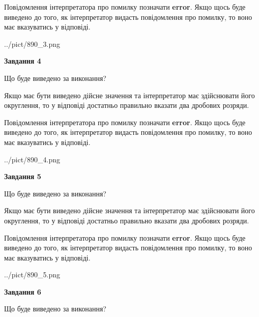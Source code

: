 \documentclass[12pt, ukrainian]{article}
\begin{document}
{\begin {Large}
Повідомлення інтерпретатора про помилку позначати \textbf{error}.
Якщо щось буде виведено до того, як інтерпретатор видасть повідомлення про помилку, 
то воно має вказуватись у відповіді. \par

\begin{center}
	{../pict/890_3.png}
\end{center}
\newpage

{\begin {center}\textbf{Завдання 4}\end {center}}\par
Що буде виведено за виконання? \par

Якщо має бути виведено дійсне значення та інтерпретатор має здійснювати його округлення, 
то у відповіді достатньо правильно вказати два дробових розряди.

Повідомлення інтерпретатора про помилку позначати \textbf{error}.
Якщо щось буде виведено до того, як інтерпретатор видасть повідомлення про помилку, 
то воно має вказуватись у відповіді. \par

\begin{center}
	{../pict/890_4.png}
\end{center}
\newpage

{\begin {center}\textbf{Завдання 5}\end {center}}\par
Що буде виведено за виконання? \par

Якщо має бути виведено дійсне значення та інтерпретатор має здійснювати його округлення, 
то у відповіді достатньо правильно вказати два дробових розряди.

Повідомлення інтерпретатора про помилку позначати \textbf{error}.
Якщо щось буде виведено до того, як інтерпретатор видасть повідомлення про помилку, 
то воно має вказуватись у відповіді. \par

\begin{center}
	{../pict/890_5.png}
\end{center}
\newpage

{\begin {center}\textbf{Завдання 6}\end {center}}\par
Що буде виведено за виконання? \par


\end{Large}}
\end{document}
